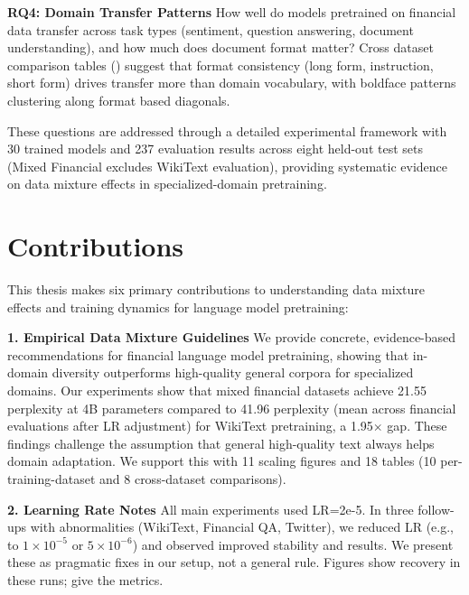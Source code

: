 \textbf{RQ4: Domain Transfer Patterns}
How well do models pretrained on financial data transfer across task types (sentiment, question answering, document understanding), and how much does document format matter? Cross dataset comparison tables () suggest that format consistency (long form, instruction, short form) drives transfer more than domain vocabulary, with boldface patterns clustering along format based diagonals.

These questions are addressed through a detailed experimental framework with 30 trained models and 237 evaluation results across eight held-out test sets (Mixed Financial excludes WikiText evaluation), providing systematic evidence on data mixture effects in specialized-domain pretraining.

\section{Contributions}

This thesis makes six primary contributions to understanding data mixture effects and training dynamics for language model pretraining:

\textbf{1. Empirical Data Mixture Guidelines}
We provide concrete, evidence-based recommendations for financial language model pretraining, showing that in-domain diversity outperforms high-quality general corpora for specialized domains. Our experiments show that mixed financial datasets achieve 21.55 perplexity at 4B parameters compared to 41.96 perplexity (mean across financial evaluations after LR adjustment) for WikiText pretraining, a 1.95$\times$ gap. These findings challenge the assumption that general high-quality text always helps domain adaptation. We support this with 11 scaling figures and 18 tables (10 per-training-dataset and 8 cross-dataset comparisons).

\textbf{2. Learning Rate Notes}
All main experiments used LR=2e-5. In three follow-ups with abnormalities (WikiText, Financial QA, Twitter), we reduced LR (e.g., to $1\times10^{-5}$ or $5\times10^{-6}$) and observed improved stability and results. We present these as pragmatic fixes in our setup, not a general rule. Figures  show recovery in these runs;  give the metrics.

